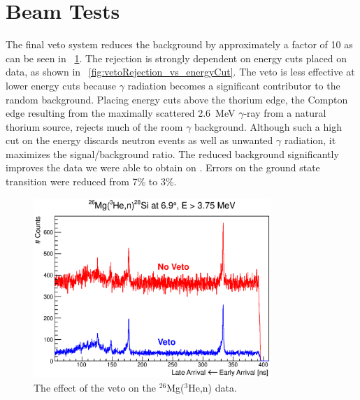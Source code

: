 \section{Beam Tests}

The final veto system reduces the background by approximately a factor of 10 as can be seen in {\fig}~\ref{fig:veto_26Mg}.  The rejection is strongly dependent on energy cuts placed on data, as shown in {\fig}~\ref{fig:vetoRejection_vs_energyCut}.  The veto is less effective at lower energy cuts because $\gamma$ radiation becomes a significant contributor to the random background.  Placing energy cuts above the thorium edge, the Compton edge resulting from the maximally scattered 2.6~MeV $\gamma$-ray \cite{PDG} from a natural thorium source, rejects much of the room $\gamma$ background.  Although such a high cut on the energy discards neutron events as well as unwanted $\gamma$ radiation, it maximizes the signal/background ratio.  The reduced background significantly improves the data we were able to obtain on \MgReaction.  Errors on the ground state transition were reduced from 7\% to 3\%.
\begin{figure}[!htbp]
\centering
\includegraphics[width=0.8\textwidth]{figures/26Mg_vetoEffect.eps}
\caption{\label{fig:vetoData}The effect of the veto on the $^{26}$Mg($^3$He,n) data.}
\label{fig:veto_26Mg}
\end{figure}
  

